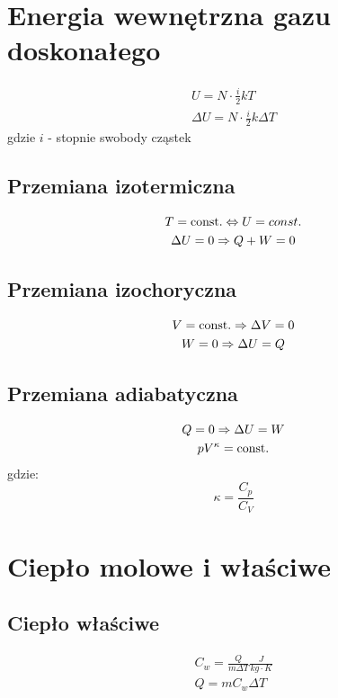  \section{Energia wewnętrzna gazu doskonałego}
    \begin{gather}
      U = N\cdot\frac{i}{2}kT\\
      \Delta U = N\cdot\frac{i}{2}k\Delta T
    \end{gather}
    gdzie $i$ - stopnie swobody cząstek
    \subsection{Przemiana izotermiczna}
      \begin{gather}
        T = \operatorname{const.} \Leftrightarrow U = const.\\
        \Delta U = 0 \Rightarrow Q + W = 0
      \end{gather}
    \subsection{Przemiana izochoryczna}
      \begin{gather}
        V = \operatorname{const.} \Rightarrow \Delta V = 0\\
        W = 0 \Rightarrow \Delta U = Q
      \end{gather}
    \subsection{Przemiana adiabatyczna}
      \begin{gather}
        Q = 0 \Rightarrow \Delta U = W\\
        pV^\kappa = \operatorname{const.}
      \end{gather}
      gdzie:
      \begin{equation}
        \kappa = \frac{C_p}{C_V}
      \end{equation}
  \section{Ciepło molowe i właściwe}
    \subsection{Ciepło właściwe}
      \begin{gather}
        C_w = \frac{Q}{m\Delta T} \unit{\frac{J}{kg\cdot K}}\\
        Q = mC_w\Delta T
      \end{gather}
